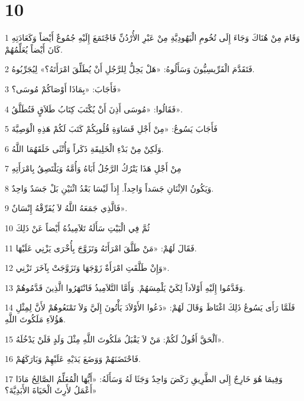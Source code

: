 \chapter{10}

\par 1 وَقَامَ مِنْ هُنَاكَ وَجَاءَ إِلَى تُخُومِ الْيَهُودِيَّةِ مِنْ عَبْرِ الأُرْدُنِّ فَاجْتَمَعَ إِلَيْهِ جُمُوعٌ أَيْضاً وَكَعَادَتِهِ كَانَ أَيْضاً يُعَلِّمُهُمْ.
\par 2 فَتَقَدَّمَ الْفَرِّيسِيُّونَ وَسَأَلُوهُ: «هَلْ يَحِلُّ لِلرَّجُلِ أَنْ يُطَلِّقَ امْرَأَتَهُ؟» لِيُجَرِّبُوهُ.
\par 3 فَأَجَابَ: «بِمَاذَا أَوْصَاكُمْ مُوسَى؟»
\par 4 فَقَالُوا: «مُوسَى أَذِنَ أَنْ يُكْتَبَ كِتَابُ طَلاَقٍ فَتُطَلَّقُ».
\par 5 فَأَجَابَ يَسُوعُ: «مِنْ أَجْلِ قَسَاوَةِ قُلُوبِكُمْ كَتَبَ لَكُمْ هَذِهِ الْوَصِيَّةَ
\par 6 وَلَكِنْ مِنْ بَدْءِ الْخَلِيقَةِ ذَكَراً وَأُنْثَى خَلَقَهُمَا اللَّهُ.
\par 7 مِنْ أَجْلِ هَذَا يَتْرُكُ الرَّجُلُ أَبَاهُ وَأُمَّهُ وَيَلْتَصِقُ بِامْرَأَتِهِ
\par 8 وَيَكُونُ الاِثْنَانِ جَسَداً وَاحِداً. إِذاً لَيْسَا بَعْدُ اثْنَيْنِ بَلْ جَسَدٌ وَاحِدٌ.
\par 9 فَالَّذِي جَمَعَهُ اللَّهُ لاَ يُفَرِّقْهُ إِنْسَانٌ».
\par 10 ثُمَّ فِي الْبَيْتِ سَأَلَهُ تَلاَمِيذُهُ أَيْضاً عَنْ ذَلِكَ
\par 11 فَقَالَ لَهُمْ: «مَنْ طَلَّقَ امْرَأَتَهُ وَتَزَوَّجَ بِأُخْرَى يَزْنِي عَلَيْهَا.
\par 12 وَإِنْ طَلَّقَتِ امْرَأَةٌ زَوْجَهَا وَتَزَوَّجَتْ بِآخَرَ تَزْنِي».
\par 13 وَقَدَّمُوا إِلَيْهِ أَوْلاَداً لِكَيْ يَلْمِسَهُمْ. وَأَمَّا التَّلاَمِيذُ فَانْتَهَرُوا الَّذِينَ قَدَّمُوهُمْ.
\par 14 فَلَمَّا رَأَى يَسُوعُ ذَلِكَ اغْتَاظَ وَقَالَ لَهُمْ: «دَعُوا الأَوْلاَدَ يَأْتُونَ إِلَيَّ وَلاَ تَمْنَعُوهُمْ لأَنَّ لِمِثْلِ هَؤُلاَءِ مَلَكُوتَ اللَّهِ.
\par 15 اَلْحَقَّ أَقُولُ لَكُمْ: مَنْ لاَ يَقْبَلُ مَلَكُوتَ اللَّهِ مِثْلَ وَلَدٍ فَلَنْ يَدْخُلَهُ».
\par 16 فَاحْتَضَنَهُمْ وَوَضَعَ يَدَيْهِ عَلَيْهِمْ وَبَارَكَهُمْ.
\par 17 وَفِيمَا هُوَ خَارِجٌ إِلَى الطَّرِيقِ رَكَضَ وَاحِدٌ وَجَثَا لَهُ وَسَأَلَهُ: «أَيُّهَا الْمُعَلِّمُ الصَّالِحُ مَاذَا أَعْمَلُ لأَرِثَ الْحَيَاةَ الأَبَدِيَّةَ؟»
